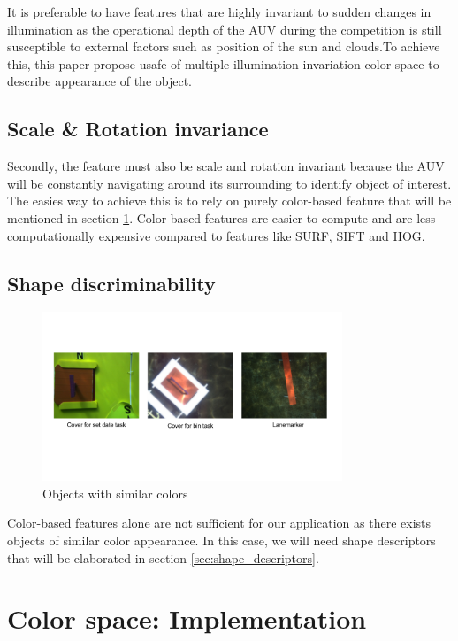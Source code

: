 \documentclass[hyp]{socreport}
\begin{document}
It is preferable to have features that are highly invariant to sudden changes in
illumination as the operational depth of the AUV during the competition is still
susceptible to external factors such as position of the sun and clouds.To
achieve this, this paper propose usafe of multiple illumination invariation
color space to describe appearance of the object.

\subsection{Scale \& Rotation invariance}
Secondly, the feature must also be scale and rotation invariant because the AUV
will be constantly navigating around its surrounding to identify object of
interest. The easies way to achieve this is to rely on purely color-based
feature that will be mentioned in section \ref{sec:color_descriptors}. Color-based features are easier to
compute and are less computationally expensive compared to features like SURF,
SIFT and HOG.

\subsection{Shape discriminability}

\begin{figure}[H]
\centering
  \includegraphics[width=0.8\textwidth, height=0.3\textheight]{similarcolor.png}
  \caption{Objects with similar colors}
  \label{fig:similar_color}
\end{figure}

Color-based features alone are not sufficient for our application as there
exists objects of similar color appearance. In this case, we will need shape
descriptors that will be elaborated in section \ref{sec:shape_descriptors}.

\section{Color space: Implementation}
\label{sec:color_descriptors}
\end{document}

